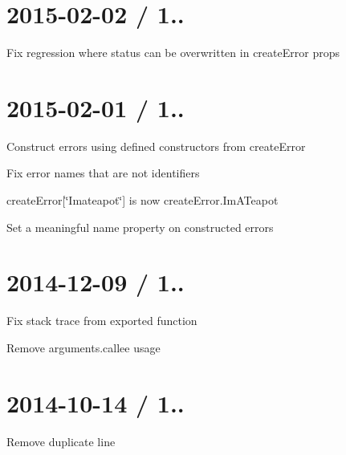 \section*{2015-\/02-\/02 / 1.. }


\begin{DoxyItemize}
\item Fix regression where status can be overwritten in {\ttfamily create\+Error} {\ttfamily props}
\end{DoxyItemize}

\section*{2015-\/02-\/01 / 1.. }


\begin{DoxyItemize}
\item Construct errors using defined constructors from {\ttfamily create\+Error}
\item Fix error names that are not identifiers
\begin{DoxyItemize}
\item {\ttfamily create\+Error\mbox{[}\char`\"{}\+I\textquotesingle{}mateapot\char`\"{}\mbox{]}} is now {\ttfamily create\+Error.\+Im\+A\+Teapot}
\end{DoxyItemize}
\item Set a meaningful {\ttfamily name} property on constructed errors
\end{DoxyItemize}

\section*{2014-\/12-\/09 / 1.. }


\begin{DoxyItemize}
\item Fix stack trace from exported function
\item Remove {\ttfamily arguments.\+callee} usage
\end{DoxyItemize}

\section*{2014-\/10-\/14 / 1.. }


\begin{DoxyItemize}
\item Remove duplicate line
\end{DoxyItemize}

